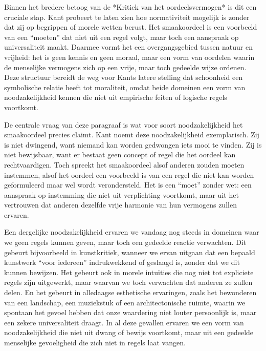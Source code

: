 \begin{mdframed}[leftmargin=0pt,rightmargin=0pt,backgroundcolor=blue!6,linecolor=white,innertopmargin=6pt,innerbottommargin=6pt]
Binnen het bredere betoog van de *Kritiek van het oordeelsvermogen* is dit een cruciale stap. Kant probeert te laten zien hoe normativiteit mogelijk is zonder dat zij op begrippen of morele wetten berust. Het smaakoordeel is een voorbeeld van een “moeten” dat niet uit een regel volgt, maar toch een aanspraak op universaliteit maakt. Daarmee vormt het een overgangsgebied tussen natuur en vrijheid: het is geen kennis en geen moraal, maar een vorm van oordelen waarin de menselijke vermogens zich op een vrije, maar toch gedeelde wijze ordenen. Deze structuur bereidt de weg voor Kants latere stelling dat schoonheid een symbolische relatie heeft tot moraliteit, omdat beide domeinen een vorm van noodzakelijkheid kennen die niet uit empirische feiten of logische regels voortkomt.

De centrale vraag van deze paragraaf is wat voor soort noodzakelijkheid het smaakoordeel precies claimt. Kant noemt deze noodzakelijkheid exemplarisch. Zij is niet dwingend, want niemand kan worden gedwongen iets mooi te vinden. Zij is niet bewijsbaar, want er bestaat geen concept of regel die het oordeel kan rechtvaardigen. Toch spreekt het smaakoordeel alsof anderen zouden moeten instemmen, alsof het oordeel een voorbeeld is van een regel die niet kan worden geformuleerd maar wel wordt verondersteld. Het is een “moet” zonder wet: een aanspraak op instemming die niet uit verplichting voortkomt, maar uit het vertrouwen dat anderen dezelfde vrije harmonie van hun vermogens zullen ervaren.

Een dergelijke noodzakelijkheid ervaren we vandaag nog steeds in domeinen waar we geen regels kunnen geven, maar toch een gedeelde reactie verwachten. Dit gebeurt bijvoorbeeld in kunstkritiek, wanneer we ervan uitgaan dat een bepaald kunstwerk “voor iedereen” indrukwekkend of geslaagd is, zonder dat we dit kunnen bewijzen. Het gebeurt ook in morele intuïties die nog niet tot expliciete regels zijn uitgewerkt, maar waarvan we toch verwachten dat anderen ze zullen delen. En het gebeurt in alledaagse esthetische ervaringen, zoals het bewonderen van een landschap, een muziekstuk of een architectonische ruimte, waarin we spontaan het gevoel hebben dat onze waardering niet louter persoonlijk is, maar een zekere universaliteit draagt. In al deze gevallen ervaren we een vorm van noodzakelijkheid die niet uit dwang of bewijs voortkomt, maar uit een gedeelde menselijke gevoeligheid die zich niet in regels laat vangen.

\end{mdframed}

